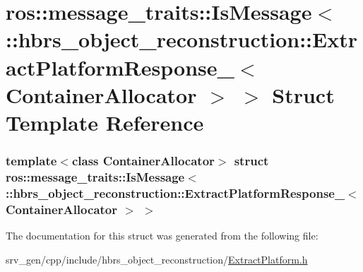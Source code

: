 \hypertarget{structros_1_1message__traits_1_1_is_message_3_01_1_1hbrs__object__reconstruction_1_1_extract_pla3b061de190142d71a2a58e9c81ed7199}{\section{ros\-:\-:message\-\_\-traits\-:\-:\-Is\-Message$<$ \-:\-:hbrs\-\_\-object\-\_\-reconstruction\-:\-:\-Extract\-Platform\-Response\-\_\-$<$ \-Container\-Allocator $>$ $>$ \-Struct \-Template \-Reference}
\label{structros_1_1message__traits_1_1_is_message_3_01_1_1hbrs__object__reconstruction_1_1_extract_pla3b061de190142d71a2a58e9c81ed7199}
}
\subsubsection*{template$<$class Container\-Allocator$>$ struct ros\-::message\-\_\-traits\-::\-Is\-Message$<$ \-::hbrs\-\_\-object\-\_\-reconstruction\-::\-Extract\-Platform\-Response\-\_\-$<$ Container\-Allocator $>$ $>$}



\-The documentation for this struct was generated from the following file\-:\begin{DoxyCompactItemize}
\item 
srv\-\_\-gen/cpp/include/hbrs\-\_\-object\-\_\-reconstruction/\hyperlink{_extract_platform_8h}{\-Extract\-Platform.\-h}\end{DoxyCompactItemize}
